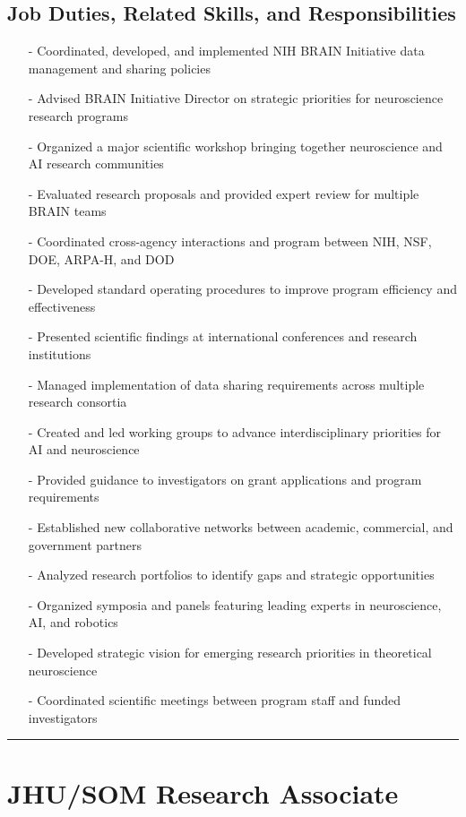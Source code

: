 \documentclass[10pt]{article}
\begin{document}
\subsection*{Job Duties, Related Skills, and Responsibilities}

\begin{itemize}
\item[-] Coordinated, developed, and implemented NIH BRAIN Initiative data management and sharing policies
\item[-] Advised BRAIN Initiative Director on strategic priorities for neuroscience research programs
\item[-] Organized a major scientific workshop bringing together neuroscience and AI research communities
\item[-] Evaluated research proposals and provided expert review for multiple BRAIN teams
\item[-] Coordinated cross-agency interactions and program between NIH, NSF, DOE, ARPA-H, and DOD
\item[-] Developed standard operating procedures to improve program efficiency and effectiveness
\item[-] Presented scientific findings at international conferences and research institutions
\item[-] Managed implementation of data sharing requirements across multiple research consortia
\item[-] Created and led working groups to advance interdisciplinary priorities for AI and neuroscience
\item[-] Provided guidance to investigators on grant applications and program requirements
\item[-] Established new collaborative networks between academic, commercial, and government partners
\item[-] Analyzed research portfolios to identify gaps and strategic opportunities
\item[-] Organized symposia and panels featuring leading experts in neuroscience, AI, and robotics
\item[-] Developed strategic vision for emerging research priorities in theoretical neuroscience
\item[-] Coordinated scientific meetings between program staff and funded investigators
\end{itemize}



\vspace{.2in}
\hrule
\section{JHU/SOM Research Associate }
\label{sec:job1}
\end{document}
